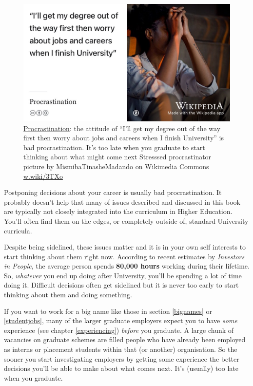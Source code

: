 \documentclass[
]{book}
\begin{document}
\begin{figure}

{\centering \includegraphics[width=0.99\linewidth]{images/procrastinator} 

}

\caption{\href{https://en.wikipedia.org/wiki/Procrastination}{Procrastination}: the attitude of ``I'll get my degree out of the way first then worry about jobs and careers when I finish University'' is bad procrastination. It's too late when you graduate to start thinking about what might come next \citep{procrastination} Stresssed procrastinator picture by MismibaTinasheMadando on Wikimedia Commons \href{https://w.wiki/3TXo}{w.wiki/3TXo}}\label{fig:procrastination-fig}
\end{figure}



Postponing decisions about your career is usually bad procrastination. It probably doesn't help that many of issues described and discussed in this book are typically not closely integrated into the curriculum in Higher Education. You'll often find them on the edges, or completely outside of, standard University curricula.

Despite being sidelined, these issues matter and it is in your own self interests to start thinking about them right now. According to recent estimates by \emph{Investors in People}, the average person spends \textbf{80,000 hours} working during their lifetime. \citep{iip2} So, \emph{whatever} you end up doing after University, you'll be spending a lot of time doing it. Difficult decisions often get sidelined but it is never too early to start thinking about them and doing something.

If you want to work for a big name like those in section \ref{bignames} or \ref{studentjobs}, many of the larger graduate employers expect you to have \emph{some} experience (see chapter \ref{experiencing}) \emph{before} you graduate. A large chunk of vacancies on graduate schemes are filled people who have already been employed as interns or placement students within that (or another) organisation. So the sooner you start investigating employers by getting some experience the better decisions you'll be able to make about what comes next. It's (usually) too late when you graduate.
\end{document}
